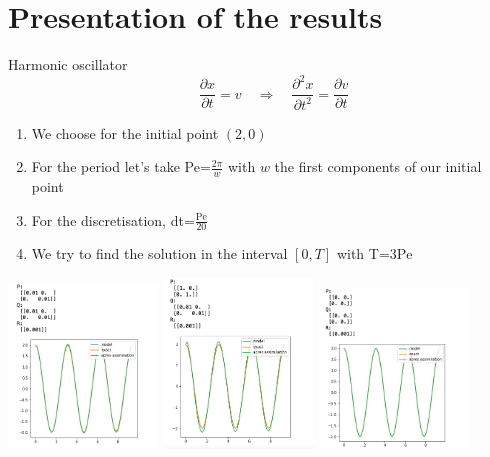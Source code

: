\documentclass[10pt,xcolor={table,dvipsnames},t]{beamer}
\begin{document}
\section{Presentation of the results}
    \begin{frame}{Harmonic oscillator}
        $$\qquad \frac{\partial x}{\partial t}=v \quad \Rightarrow \quad \frac{\partial^2 x}{\partial t^2}=\frac{\partial v}{\partial t}$$
        \begin{enumerate}[\textbullet]
			\item We choose for the initial point $(2,0)$
			\item For the period let's take Pe=$\frac{2\pi}{w}$ with $w$ the first components of our initial point
			\item For the discretisation,  dt=$\frac{\text{Pe}}{20}$ 
			\item We try to find the solution in the interval $[0,T]$ with T=$3\text{Pe}$
    	\end{enumerate}
    \end{frame}
    \begin{frame}
        \includegraphics[width=0.3\textwidth]{"images/oscillator1.png"}
		\includegraphics[width=0.3\textwidth]{"images/oscillator2.png"}
		\includegraphics[width=0.3\textwidth]{"images/oscillator3.png"}
        
    \end{frame}
\end{document}
